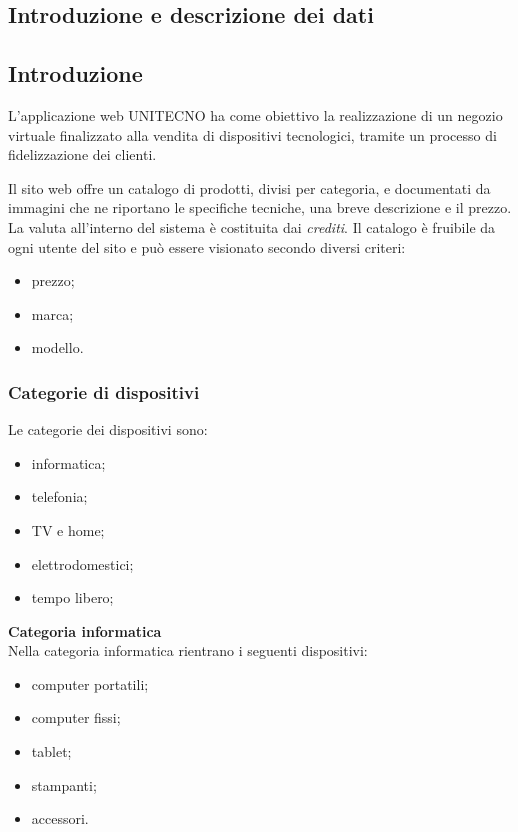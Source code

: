 \documentclass[a4paper, 14pt]{article}
\begin{document}
	\begin{flushleft}
		
	\section{Introduzione e descrizione dei dati}
		\subsection{Introduzione}
			L'applicazione web UNITECNO ha come obiettivo la realizzazione di un negozio virtuale finalizzato alla vendita di dispositivi tecnologici, tramite un processo di fidelizzazione dei clienti.
			
			Il sito web offre un catalogo di prodotti, divisi per categoria,
			e documentati da immagini che ne riportano le specifiche tecniche, una breve descrizione e il prezzo. 
			La valuta all'interno del sistema è costituita dai \textit{crediti}.
			Il catalogo è fruibile da ogni utente del sito e può essere visionato secondo diversi criteri:
			\begin{itemize}
				\item prezzo;
				\item marca;
				\item modello.
			\end{itemize}
			
			\subsubsection{Categorie di dispositivi}
			Le categorie dei dispositivi sono:
			\begin{itemize}
				\item informatica;
				\item telefonia;
				\item TV e home;
				\item elettrodomestici;
				\item tempo libero;
			\end{itemize}
		
			\bigskip \textbf{Categoria informatica} \\ \smallskip
			Nella categoria informatica rientrano i seguenti dispositivi:
				\begin{itemize}
					\item computer portatili;
					\item computer fissi;
					\item tablet;
					\item stampanti;
					\item accessori.
				\end{itemize}
			

\end{flushleft}
\end{document}

